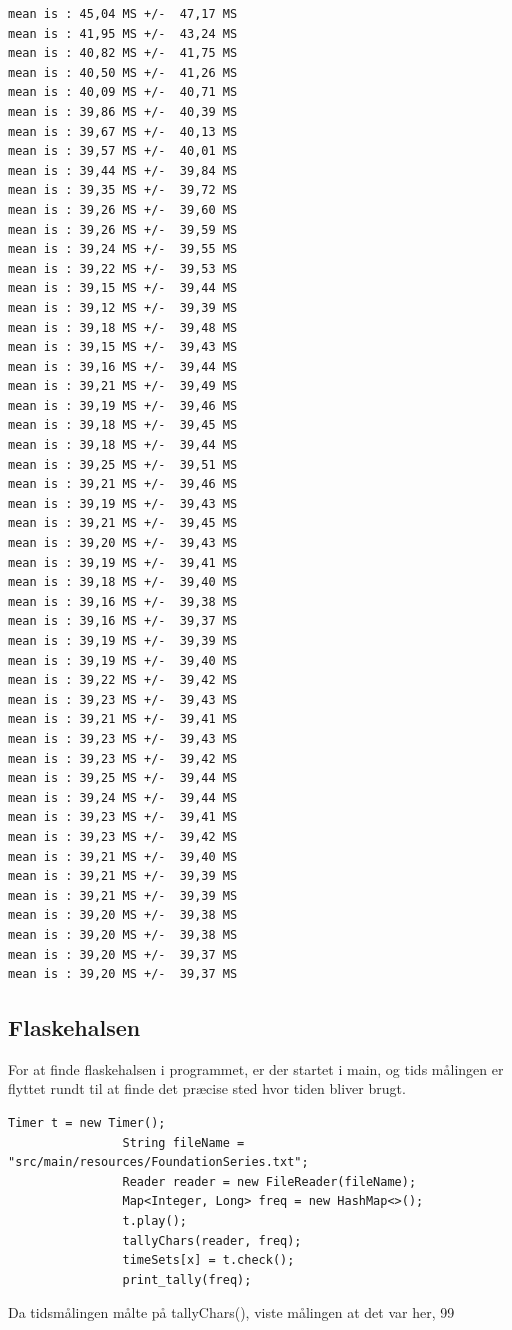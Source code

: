 \begin{lstlisting}
mean is : 45,04 MS +/-  47,17 MS
mean is : 41,95 MS +/-  43,24 MS
mean is : 40,82 MS +/-  41,75 MS
mean is : 40,50 MS +/-  41,26 MS
mean is : 40,09 MS +/-  40,71 MS
mean is : 39,86 MS +/-  40,39 MS
mean is : 39,67 MS +/-  40,13 MS
mean is : 39,57 MS +/-  40,01 MS
mean is : 39,44 MS +/-  39,84 MS
mean is : 39,35 MS +/-  39,72 MS
mean is : 39,26 MS +/-  39,60 MS
mean is : 39,26 MS +/-  39,59 MS
mean is : 39,24 MS +/-  39,55 MS
mean is : 39,22 MS +/-  39,53 MS
mean is : 39,15 MS +/-  39,44 MS
mean is : 39,12 MS +/-  39,39 MS
mean is : 39,18 MS +/-  39,48 MS
mean is : 39,15 MS +/-  39,43 MS
mean is : 39,16 MS +/-  39,44 MS
mean is : 39,21 MS +/-  39,49 MS
mean is : 39,19 MS +/-  39,46 MS
mean is : 39,18 MS +/-  39,45 MS
mean is : 39,18 MS +/-  39,44 MS
mean is : 39,25 MS +/-  39,51 MS
mean is : 39,21 MS +/-  39,46 MS
mean is : 39,19 MS +/-  39,43 MS
mean is : 39,21 MS +/-  39,45 MS
mean is : 39,20 MS +/-  39,43 MS
mean is : 39,19 MS +/-  39,41 MS
mean is : 39,18 MS +/-  39,40 MS
mean is : 39,16 MS +/-  39,38 MS
mean is : 39,16 MS +/-  39,37 MS
mean is : 39,19 MS +/-  39,39 MS
mean is : 39,19 MS +/-  39,40 MS
mean is : 39,22 MS +/-  39,42 MS
mean is : 39,23 MS +/-  39,43 MS
mean is : 39,21 MS +/-  39,41 MS
mean is : 39,23 MS +/-  39,43 MS
mean is : 39,23 MS +/-  39,42 MS
mean is : 39,25 MS +/-  39,44 MS
mean is : 39,24 MS +/-  39,44 MS
mean is : 39,23 MS +/-  39,41 MS
mean is : 39,23 MS +/-  39,42 MS
mean is : 39,21 MS +/-  39,40 MS
mean is : 39,21 MS +/-  39,39 MS
mean is : 39,21 MS +/-  39,39 MS
mean is : 39,20 MS +/-  39,38 MS
mean is : 39,20 MS +/-  39,38 MS
mean is : 39,20 MS +/-  39,37 MS
mean is : 39,20 MS +/-  39,37 MS
\end{lstlisting}


\subsection*{Flaskehalsen}
For at finde flaskehalsen i programmet, er der startet i main, og tids målingen er flyttet rundt til at finde det præcise sted hvor tiden bliver brugt.

\begin{lstlisting}
Timer t = new Timer();
                String fileName = "src/main/resources/FoundationSeries.txt";
                Reader reader = new FileReader(fileName);
                Map<Integer, Long> freq = new HashMap<>();
                t.play();
                tallyChars(reader, freq);
                timeSets[x] = t.check();
                print_tally(freq);
\end{lstlisting}

Da tidsmålingen målte på tallyChars(), viste målingen at det var her, 99%



